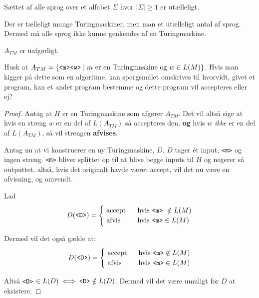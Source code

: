 
\begin{corollary}
	Sættet af alle sprog over et alfabet $\Sigma$ hvor $|\Sigma| \ge 1$ er utælleligt.
\end{corollary}


Der er tælleligt mange Turingmaskiner, men man et utælleligt antal af sprog. Dermed må alle sprog ikke kunne genkendes af en Turingmaskine.

\begin{theorem}
  \label{teo:atmundecidable}
	$A_{TM}$ er uafgørligt.
\end{theorem}

Husk at $A_{TM} = \{\text{\texttt{<m><w>}} \mid m \text{ er en Turingmaskine og } w \in L(M)\}$. Hvis man kigger på dette som en algoritme, kan spørgsmålet omskrives til hvorvidt, givet et program, kan et andet program bestemme og dette program vil accepteres eller ej?

\begin{proof}
	Antag at $H$ er en Turingmaskine som afgører $A_{TM}$. Det vil altså sige at hvis en streng $w$ er en del af $L(A_{TM})$ så accepteres den, \textbf{og} hvis $w$ \textit{ikke} er en del af $L(A_{TM})$, så vil strengen \textbf{afvises}.

	Antag nu at vi konstruerer en ny Turingmaskine, $D$. $D$ tager ét input, \texttt{<m>} og ingen streng. \texttt{<m>} bliver splittet op til at blive begge inputs til $H$ og negerer så outputtet, altså, hvis det originalt havde været accept, vil det nu være en afvisning, og omvendt.

	Lad \begin{equation*}
		D(\text{\texttt{<D>}}) =
		\begin{cases}
			\text{ accept } & \text{ hvis \texttt{<m>} } \notin L(M) \\
			\text{ afvis}   & \text{ hvis \texttt{<m>}}  \in L(M)
		\end{cases}
	\end{equation*}

	Dermed vil det også gælde at:
	\begin{equation*}
		D(\text{\texttt{<D>}}) = \begin{cases}
			\text{ accept } & \text{ hvis \texttt{<m>}}  \notin L(M) \\
			\text{ afvis }  & \text{ hvis \texttt{<m>}} \in L(M)
		\end{cases}
	\end{equation*}

	Altså \texttt{<D>} $\in L(D) \iff \text{\texttt{<D>}} \notin L(D)$.
	Dermed vil det være umuligt for $D$ at eksistere.
\end{proof}

